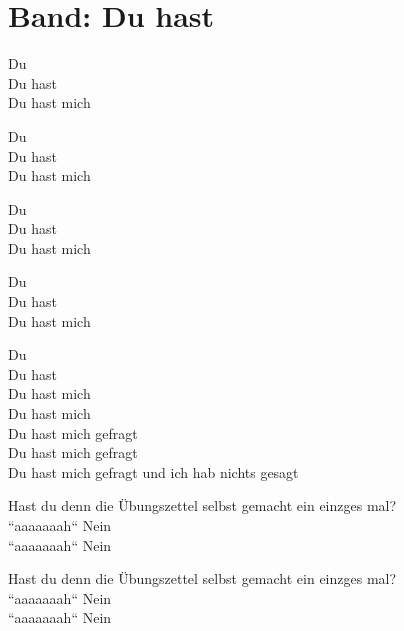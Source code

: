\newpage
\section{Band: Du hast}
\label{sec:band_duhast}
\charaktere{\Chor \Sing}

\begin{verseplay}[10em]
\s{\Sing} Du\\
Du hast\\
Du hast mich\\
\end{verseplay}
\begin{verseplay}[10em]
\s{\Sing} Du\\
Du hast\\
Du hast mich\\
\end{verseplay}
\begin{verseplay}[10em]
\s{\Sing} Du\\
Du hast\\
Du hast mich\\
\end{verseplay}
\begin{verseplay}[10em]
\s{\Sing} Du\\
Du hast\\
Du hast mich\\
\end{verseplay}
\begin{verseplay}[10em]
\s{\Sing} Du\\
Du hast\\
Du hast mich\\
Du hast mich\\
Du hast mich gefragt\\
Du hast mich gefragt\\
Du hast mich gefragt und ich hab nichts gesagt\\
\end{verseplay}
\begin{verseplay}[10em]
\s{\Sing} Hast du denn die Übungszettel selbst gemacht ein einzges mal?\\
\s{\Chor}``aaaaaaah`` \s{\Sing} Nein\\
\s{\Chor}``aaaaaaah`` \s{\Sing} Nein\\
\end{verseplay}
\begin{verseplay}[10em]
\s{\Sing} Hast du denn die Übungszettel selbst gemacht ein einzges mal?\\
\s{\Chor}``aaaaaaah`` \s{\Sing} Nein\\
\s{\Chor}``aaaaaaah`` \s{\Sing} Nein\\
\end{verseplay}
